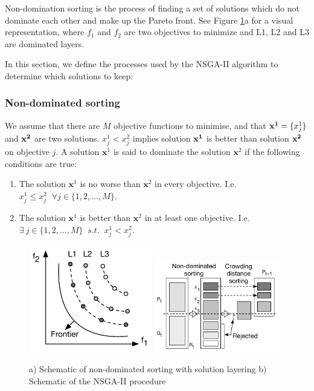 Non-domination sorting is the process of finding a set of solutions which do not dominate each other and make up the Pareto front. See Figure \ref{fig:pareto-layering}a for a visual representation, where $f_1$ and $f_2$ are two objectives to minimize and L1, L2 and L3 are dominated layers.


In this section, we define the processes used by the NSGA-II algorithm to determine which solutions to keep:
\subsubsection{Non-dominated sorting}
We assume that there are $M$ objective functions to minimise, and that ${\bf x^{1}} = \{x_j^{1}\}$ and $\bf x^{2}$ are two solutions. $x_j^{1}<x_j^{2}$ implies solution $\bf x^{1}$ is better than solution $\bf x^{2}$ on objective $j$. A solution $\mathbf{x}^{1}$ is said to dominate the solution $\mathbf{x}^{2}$ if the following conditions are true:
\begin{enumerate}
	\item The solution $\mathbf{x}^{1}$ is no worse than $\mathbf{x}^{2}$ in every objective. I.e. $x^{1}_j \leq x^{2}_j \;\;  \forall j \in\{1,2,\ldots,M\}$.
	\item The solution $\mathbf{x}^{1}$ is better than $\mathbf{x}^{2}$ in at least one objective. I.e. $\exists\  {j}\in \{ 1,2,\ldots,M\} \;\; s.t. \;\;x^{1}_j < x^{2}_j$.
\end{enumerate}



\begin{figure}[t] 
	\vskip -10pt
	\centering
	\includegraphics[width=0.48\textwidth]{Chapter6/figures/carbon_optimiser/paretofrontier/paretofrontier}
	\includegraphics[width=0.480\textwidth]{Chapter6/figures/carbon_optimiser/algsketch/sketch2}
	\vskip -8pt
	\caption{a) Schematic of non-dominated sorting with solution layering b) Schematic of the NSGA-II procedure}
	\label{fig:pareto-layering}
	\vskip -15pt
\end{figure}


